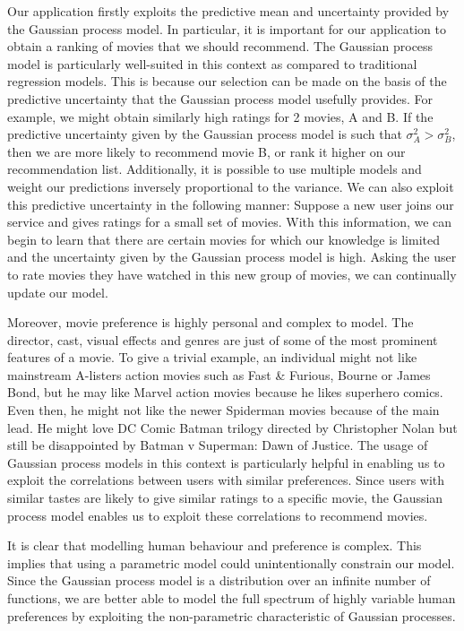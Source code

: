 \documentclass[letterpaper]{article}
\begin{document}
Our application firstly exploits the predictive mean and uncertainty provided by the Gaussian process model.
In particular, it is important for our application to obtain a ranking of movies that we should recommend.
The Gaussian process model is particularly well-suited in this context as compared to traditional regression models.
This is because our selection can be made on the basis of the predictive uncertainty that the Gaussian process model usefully provides.
For example, we might obtain similarly high ratings for 2 movies, A and B. If the predictive uncertainty given by the Gaussian process model is such that $\sigma_A^2 > \sigma_B^2$, then we are more likely to recommend movie B, or rank it higher on our recommendation list.
Additionally, it is possible to use multiple models and weight our predictions inversely proportional to the variance.
We can also exploit this predictive uncertainty in the following manner: Suppose a new user joins our service and gives ratings for a small set of movies.
With this information, we can begin to learn that there are certain movies for which our knowledge is limited and the uncertainty given by the Gaussian process model is high.
Asking the user to rate movies they have watched in this new group of movies, we can continually update our model.

Moreover, movie preference is highly personal and complex to model.
The director, cast, visual effects and genres are just of some of the most prominent features of a movie.
To give a trivial example, an individual might not like mainstream A-listers action movies such as Fast \& Furious, Bourne or James Bond, but he may like Marvel action movies because he likes superhero comics.
Even then, he might not like the newer Spiderman movies because of the main lead. He might love DC Comic Batman trilogy directed by Christopher Nolan but still be disappointed by Batman v Superman: Dawn of Justice.
The usage of Gaussian process models in this context is particularly helpful in enabling us to exploit the correlations between users with similar preferences.
Since users with similar tastes are likely to give similar ratings to a specific movie, the Gaussian process model enables us to exploit these correlations to recommend movies.

It is clear that modelling human behaviour and preference is complex. This implies that using a parametric model could unintentionally constrain our model. Since the Gaussian process model is a distribution over an infinite number of functions, we are better able to model the full spectrum of highly variable human preferences by exploiting the non-parametric characteristic of Gaussian processes.
\end{document}

